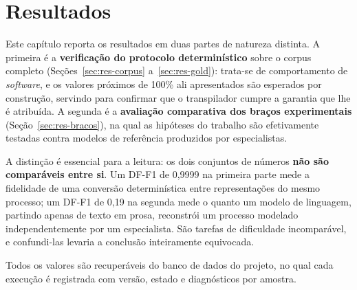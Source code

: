 %
%

\chapter{Resultados}
\label{chap:resultados}

Este capítulo reporta os resultados em duas partes de natureza distinta. A primeira é a \textbf{verificação do protocolo determinístico} sobre o corpus completo (Seções~\ref{sec:res-corpus} a~\ref{sec:res-gold}): trata-se de comportamento de \textit{software}, e os valores próximos de 100\% ali apresentados são esperados por construção, servindo para confirmar que o transpilador cumpre a garantia que lhe é atribuída. A segunda é a \textbf{avaliação comparativa dos braços experimentais} (Seção~\ref{sec:res-bracos}), na qual as hipóteses do trabalho são efetivamente testadas contra modelos de referência produzidos por especialistas.

A distinção é essencial para a leitura: os dois conjuntos de números \textbf{não são comparáveis entre si}. Um DF-F1 de 0,9999 na primeira parte mede a fidelidade de uma conversão determinística entre representações do mesmo processo; um DF-F1 de 0,19 na segunda mede o quanto um modelo de linguagem, partindo apenas de texto em prosa, reconstrói um processo modelado independentemente por um especialista. São tarefas de dificuldade incomparável, e confundi-las levaria a conclusão inteiramente equivocada.

Todos os valores são recuperáveis do banco de dados do projeto, no qual cada execução é registrada com versão, estado e diagnósticos por amostra.

